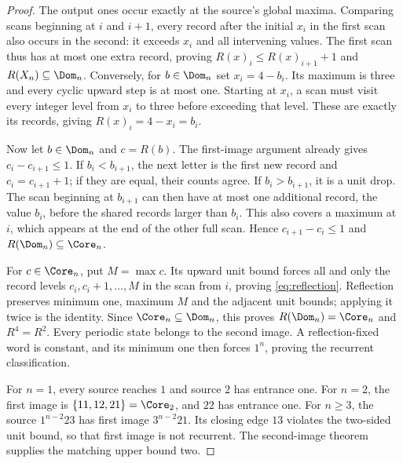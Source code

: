 \begin{proof}
The output ones occur exactly at the source's global maxima. Comparing
scans beginning at $i$ and $i+1$, every record after the initial $x_i$ in
the first scan also occurs in the second: it exceeds $x_i$ and all
intervening values. The first scan thus has at most one extra record,
proving $R(x)_i\le R(x)_{i+1}+1$ and $R(X_n)\subseteq\Dom_n$.
Conversely, for $b\in\Dom_n$ set $x_i=4-b_i$. Its maximum is three and
every cyclic upward step is at most one. Starting at $x_i$, a scan must
visit every integer level from $x_i$ to three before exceeding that level.
These are exactly its records, giving $R(x)_i=4-x_i=b_i$.

Now let $b\in\Dom_n$ and $c=R(b)$. The first-image argument already
gives $c_i-c_{i+1}\le1$. If $b_i<b_{i+1}$, the next letter is the first
new record and $c_i=c_{i+1}+1$; if they are equal, their counts agree.
If $b_i>b_{i+1}$, it is a unit drop. The scan beginning at $b_{i+1}$
can then have at most one additional record, the value $b_i$, before the
shared records larger than $b_i$. This also covers a maximum at $i$,
which appears at the end of the other full scan. Hence
$c_{i+1}-c_i\le1$ and $R(\Dom_n)\subseteq\Core_n$.

For $c\in\Core_n$, put $M=\max c$. Its upward unit bound forces all
and only the record levels $c_i,c_i+1,\ldots,M$ in the scan from $i$,
proving \eqref{eq:reflection}. Reflection preserves minimum one, maximum
$M$ and the adjacent unit bounds; applying it twice is the identity.
Since $\Core_n\subseteq\Dom_n$, this proves
$R(\Dom_n)=\Core_n$ and $R^4=R^2$. Every periodic state belongs to the
second image. A reflection-fixed word is constant, and its minimum one
then forces $1^n$, proving the recurrent classification.

For $n=1$, every source reaches $1$ and source $2$ has entrance one.
For $n=2$, the first image is $\{11,12,21\}=\Core_2$, and $22$ has
entrance one. For $n\ge3$, the source $1^{n-2}23$ has first image
$3^{n-2}21$. Its closing edge $13$ violates the two-sided unit bound,
so that first image is not recurrent. The second-image theorem supplies
the matching upper bound two.
\end{proof}

